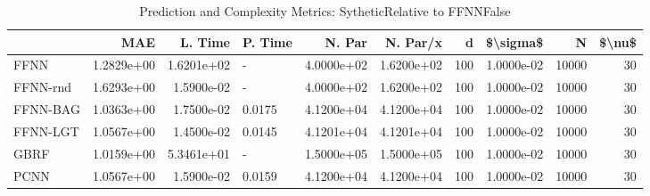 \begin{table}
\centering
\caption{Prediction and Complexity Metrics: SytheticRelative to FFNNFalse}
\label{tab__Sythetic__Fix_Neurons_QTrue}
\begin{tabular}{lrrlrrrrrr}
\toprule
{} &        MAE &    L. Time & P. Time &     N. Par &   N. Par/x &    d &   \$\textbackslash sigma\$ &      N &  \$\textbackslash nu\$ \\
\midrule
FFNN     & 1.2829e+00 & 1.6201e+02 &       - & 4.0000e+02 & 1.6200e+02 &  100 & 1.0000e-02 &  10000 &     30 \\
FFNN-rnd & 1.6293e+00 & 1.5900e-02 &       - & 4.0000e+02 & 1.6200e+02 &  100 & 1.0000e-02 &  10000 &     30 \\
FFNN-BAG & 1.0363e+00 & 1.7500e-02 &  0.0175 & 4.1200e+04 & 4.1200e+04 &  100 & 1.0000e-02 &  10000 &     30 \\
FFNN-LGT & 1.0567e+00 & 1.4500e-02 &  0.0145 & 4.1201e+04 & 4.1201e+04 &  100 & 1.0000e-02 &  10000 &     30 \\
GBRF     & 1.0159e+00 & 5.3461e+01 &       - & 1.5000e+05 & 1.5000e+05 &  100 & 1.0000e-02 &  10000 &     30 \\
PCNN     & 1.0567e+00 & 1.5900e-02 &  0.0159 & 4.1200e+04 & 4.1200e+04 &  100 & 1.0000e-02 &  10000 &     30 \\
\bottomrule
\end{tabular}
\end{table}
